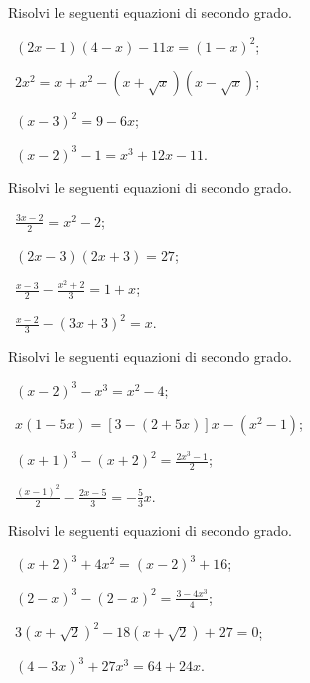 \begin{esercizio}[\Ast]
 \label{ese:3.19}
Risolvi le seguenti equazioni di secondo grado.
\begin{multicols}{2}
 \begin{enumeratea}
 \item~$(2 x-1) (4-x)-11 x = (1-x)^{2}$;
 \item~$2x^{2} = x + x^{2}-(x + \sqrt{x}) (x-\sqrt{x})$;
 \item~$(x-3)^{2} = 9-6 x$;
 \item~$(x-2)^{3}-1 = x^{3} + 12 x-11$.
 \end{enumeratea}
 \end{multicols}
\end{esercizio}

\begin{esercizio}[\Ast]
 \label{ese:3.20}
Risolvi le seguenti equazioni di secondo grado.
\begin{multicols}{2}
 \begin{enumeratea}
 \item~$\frac{3 x-2}{2} = x^{2}-2$;
 \item~$(2 x-3) (2 x + 3) = 27$;
 \item~$\frac{x-3}{2}-\frac{x^{2} + 2}{3} = 1 + x$;
 \item~$\frac{x-2}{3}-(3 x + 3)^{2} = x$.
 \end{enumeratea}
 \end{multicols}
\end{esercizio}

\begin{esercizio}[\Ast]
 \label{ese:3.21}
Risolvi le seguenti equazioni di secondo grado.
\begin{multicols}{2}
 \begin{enumeratea}
 \item~$(x-2)^{3}-x^{3} = x^{2}-4$;
 \item~$x (1-5 x) = [ 3-(2 + 5 x) ] x-(x^{2}-1)$;
 \item~$(x + 1)^{3}-(x + 2)^{2} = \frac{2 x^{3}-1}{2}$;
 \item~$\frac{(x-1)^{2}}{2}-\frac{2 x-5}{3} =-\frac{5}{3} x$.
 \end{enumeratea}
 \end{multicols}
\end{esercizio}

\begin{esercizio}[\Ast]
 \label{ese:3.22}
Risolvi le seguenti equazioni di secondo grado.
\begin{multicols}{2}
 \begin{enumeratea}
 \item~$(x + 2)^{3} + 4 x^{2} = (x-2)^{3} + 16$;
 \item~$(2-x)^{3}-(2-x)^{2} = \frac{3-4 x^{3}}{4}$;
 \item~$3 \left(x + \sqrt{2} \right)^{2}-18 \left(x + \sqrt{2}\right) + 27 = 0$;
 \item~$(4-3 x)^{3} + 27 x^{3} = 64 + 24 x$.
 \end{enumeratea}
 \end{multicols}
\end{esercizio}

